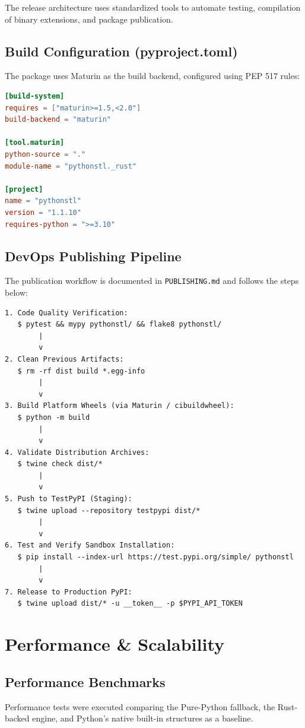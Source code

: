 \documentclass[11pt,a4paper]{article}
\begin{document}
The release architecture uses standardized tools to automate testing, compilation of binary extensions, and package publication.

\subsection{Build Configuration (pyproject.toml)}
The package uses Maturin as the build backend, configured using PEP 517 rules:
\begin{lstlisting}[language=TOML]
[build-system]
requires = ["maturin>=1.5,<2.0"]
build-backend = "maturin"

[tool.maturin]
python-source = "."
module-name = "pythonstl._rust"

[project]
name = "pythonstl"
version = "1.1.10"
requires-python = ">=3.10"
\end{lstlisting}

\subsection{DevOps Publishing Pipeline}
The publication workflow is documented in \texttt{PUBLISHING.md} and follows the steps below:

\begin{verbatim}
1. Code Quality Verification:
   $ pytest && mypy pythonstl/ && flake8 pythonstl/
        |
        v
2. Clean Previous Artifacts:
   $ rm -rf dist build *.egg-info
        |
        v
3. Build Platform Wheels (via Maturin / cibuildwheel):
   $ python -m build
        |
        v
4. Validate Distribution Archives:
   $ twine check dist/*
        |
        v
5. Push to TestPyPI (Staging):
   $ twine upload --repository testpypi dist/*
        |
        v
6. Test and Verify Sandbox Installation:
   $ pip install --index-url https://test.pypi.org/simple/ pythonstl
        |
        v
7. Release to Production PyPI:
   $ twine upload dist/* -u __token__ -p $PYPI_API_TOKEN
\end{verbatim}

\newpage

\section{Performance \& Scalability}

\subsection{Performance Benchmarks}
Performance tests were executed comparing the Pure-Python fallback, the Rust-backed engine, and Python's native built-in structures as a baseline.
\end{document}
